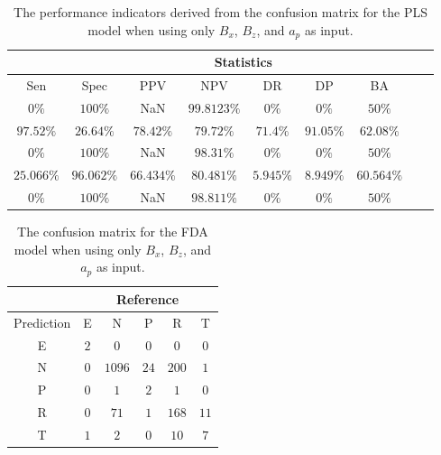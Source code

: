 \begin{table}[!ht]
	\centering
	\begin{tabular}{|c|c|c|c|c|c|c|c|c|}
		\hline
		 & \multicolumn{7}{c|}{Statistics} \\ \hline
		Sen & Spec & PPV & NPV & DR & DP & BA \\ \hline
		$0\%$ & $100\%$ & NaN & $99.8123\%$ & $0\%$ & $0\%$ & $50\%$ \\ \hline
		$97.52\%$ & $26.64\%$ & $78.42\%$ & $79.72\%$ & $71.4\%$ & $91.05\%$ & $62.08\%$ \\ \hline
		$0\%$ & $100\%$ & NaN & $98.31\%$ & $0\%$ & $0\%$ & $50\%$ \\ \hline
		$25.066\%$ & $96.062\%$ & $66.434\%$ & $80.481\%$ & $5.945\%$ & $8.949\%$ & $60.564\%$ \\ \hline
		$0\%$ & $100\%$ & NaN & $98.811\%$ & $0\%$ & $0\%$ & $50\%$ \\ \hline
	\end{tabular}
	\caption{The performance indicators derived from the confusion matrix for the PLS model when using only $B_{x}$, $B_{z}$, and $a_{p}$ as input.}
	\label{tab:cs:xzap:pls}
\end{table}

\begin{table}[!ht]
	\centering
	\begin{tabular}{|c|c|c|c|c|c|}
		\hline
		 & \multicolumn{5}{|c|}{Reference} \\ \hline
		 Prediction & E & N & P & R & T \\ \hline
		 E & $2$ & $0$ & $0$ & $0$ & $0$ \\ \hline
		 N & $0$ & $1096$ & $24$ & $200$ & $1$ \\ \hline
		 P & $0$ & $1$ & $2$ & $1$ & $0$ \\ \hline
		 R & $0$ & $71$ & $1$ & $168$ & $11$ \\ \hline
		 T & $1$ & $2$ & $0$ & $10$ & $7$ \\ \hline
	\end{tabular}
	\caption{The confusion matrix for the FDA model when using only $B_{x}$, $B_{z}$, and $a_{p}$ as input.}
	\label{tab:cm:xzap:fda}
\end{table}

